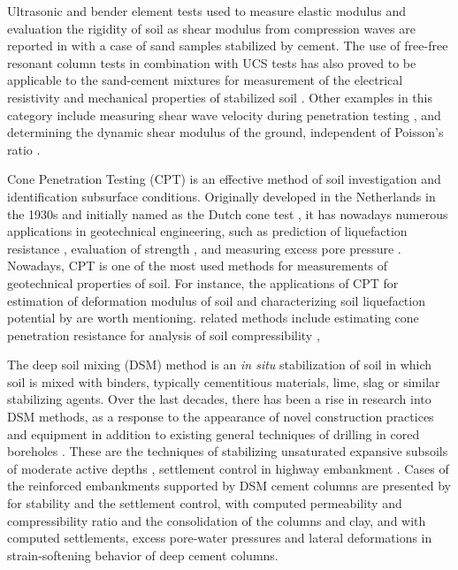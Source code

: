 \documentclass[final,3p,times,onecolumn,authoryear]{elsarticle}
\begin{document}
Ultrasonic and bender element tests used to measure elastic modulus and evaluation the rigidity of soil as shear modulus from compression waves are reported in \cite{Amaral} with a case of sand samples stabilized by cement. The use of free-free resonant column tests in combination with UCS tests has also proved to be applicable to the sand-cement mixtures for measurement of the electrical resistivity and mechanical properties of stabilized soil \citep{Rusati}. Other examples in this category include measuring shear wave velocity during penetration testing \citep{Hepton1989}, and determining the dynamic shear modulus of the ground, independent of Poisson's ratio \citep{Abbiss}. 

Cone Penetration Testing (CPT) is an effective method of soil investigation and identification subsurface conditions. Originally developed in the Netherlands in the 1930s and initially named as the Dutch cone test \citep{brouwer2007situ,mccallum_2014}, it has nowadays numerous applications in geotechnical engineering, such as prediction of liquefaction resistance \citep{Olsen,Fitzgerald,Saye}, evaluation of strength \citep{Priceetal2016,Jamiolkowski}, and measuring excess pore pressure \citep{SullyCampanella,Elsworthetal2006}. Nowadays, CPT is one of the most used methods for measurements of geotechnical properties of soil. For instance, the applications of CPT for estimation of deformation modulus of soil \citep{SHAHIEN2013633,BENZNAVARRETE2022289} and characterizing soil liquefaction potential by \cite{GUAN20221221} are worth mentioning. related methods include estimating cone penetration resistance for analysis of soil compressibility \citep{Bishtetal2021}, 

The deep soil mixing (DSM) method is an \emph{in situ} stabilization of soil in which soil is mixed with binders, typically cementitious materials, lime, slag or similar stabilizing agents. Over the last decades, there has been a rise in research into DSM methods, as a response to the appearance of novel construction practices and equipment in addition to existing general techniques of drilling in cored boreholes \citep{Hepton}. These are the techniques of stabilizing unsaturated expansive subsoils of moderate active depths \citep{MadhyannapuPuppala,Madhyannapu}, settlement control in highway embankment \citep{Archeewa}. Cases of the reinforced embankments supported by DSM cement columns are presented by \cite{Lambrechts} for stability and the settlement control, \cite{Bergado}
with computed permeability and compressibility ratio and the consolidation of the columns and clay, and \cite{Yapageetal2014} with computed settlements, excess pore-water pressures and lateral deformations in strain-softening behavior of deep cement columns.
\end{document}
